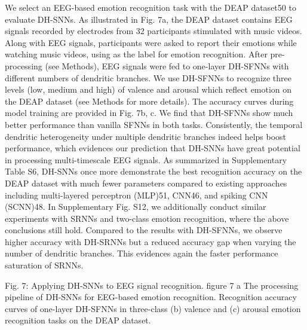 We select an EEG-based emotion recognition task with the DEAP dataset50 to evaluate DH-SNNs. As illustrated in Fig. 7a, the DEAP dataset contains EEG signals recorded by electrodes from 32 participants stimulated with music videos. Along with EEG signals, participants were asked to report their emotions while watching music videos, using as the label for emotion recognition. After pre-processing (see Methods), EEG signals were fed to one-layer DH-SFNNs with different numbers of dendritic branches. We use DH-SFNNs to recognize three levels (low, medium and high) of valence and arousal which reflect emotion on the DEAP dataset (see Methods for more details). The accuracy curves during model training are provided in Fig. 7b, c. We find that DH-SFNNs show much better performance than vanilla SFNNs in both tasks. Consistently, the temporal dendritic heterogeneity under multiple dendritic branches indeed helps boost performance, which evidences our prediction that DH-SNNs have great potential in processing multi-timescale EEG signals. As summarized in Supplementary Table S6, DH-SNNs once more demonstrate the best recognition accuracy on the DEAP dataset with much fewer parameters compared to existing approaches including multi-layered perceptron (MLP)51, CNN46, and spiking CNN (SCNN)48. In Supplementary Fig. S12, we additionally conduct similar experiments with SRNNs and two-class emotion recognition, where the above conclusions still hold. Compared to the results with DH-SFNNs, we observe higher accuracy with DH-SRNNs but a reduced accuracy gap when varying the number of dendritic branches. This evidences again the faster performance saturation of SRNNs.

Fig. 7: Applying DH-SNNs to EEG signal recognition.
figure 7
a The processing pipeline of DH-SNNs for EEG-based emotion recognition. Recognition accuracy curves of one-layer DH-SFNNs in three-class (b) valence and (c) arousal emotion recognition tasks on the DEAP dataset.


